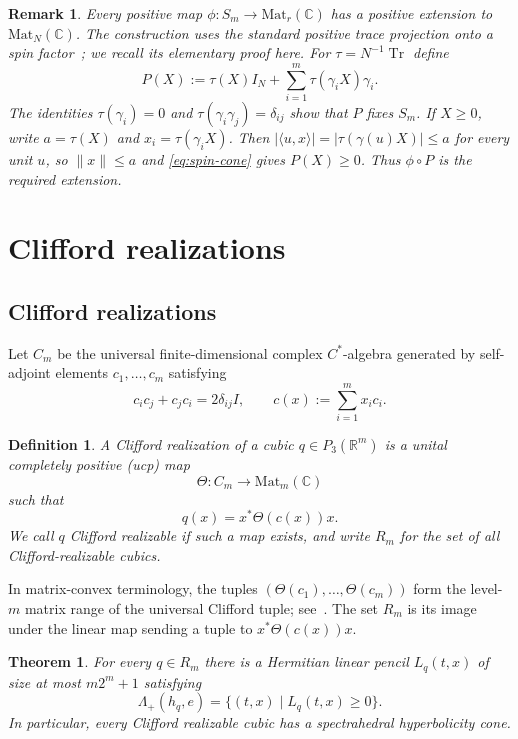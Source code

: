 \documentclass[11pt,onecolumn]{article}
\theoremstyle{blueplain}
\newtheorem{theorem}{Theorem}[section]
\theoremstyle{bluedefinition}
\newtheorem{definition}[definition]{Definition}
\theoremstyle{bluedefinition}
\newtheorem{remark}[remark]{Remark}
\newcommand{\C}{\mathbb C}
\newcommand{\M}{\mathrm{Mat}}
\newcommand{\Tr}{\operatorname{Tr}}
\begin{document}
\begin{remark}
Every positive map $\phi\colon S_m\to \M_r(\C)$ has a positive extension to $\M_N(\C)$.
The construction uses the standard positive trace projection onto a spin
factor~\cite{Stormer}; we recall its elementary proof here.
For $\tau=N^{-1}\Tr$ define
\[
P(X):=\tau(X)I_N+\sum_{i=1}^m\tau(\gamma_iX)\gamma_i.
\]
The identities $\tau(\gamma_i)=0$ and
$\tau(\gamma_i\gamma_j)=\delta_{ij}$ show that $P$ fixes $S_m$. If $X\geqslant0$,
write $a=\tau(X)$ and $x_i=\tau(\gamma_iX)$. Then
$|\langle u,x\rangle|=|\tau(\gamma(u)X)|\leqslant a$ for every unit $u$, so
$\|x\|\leqslant a$ and \eqref{eq:spin-cone} gives $P(X)\geqslant0$.
Thus $\phi\circ P$ is the required extension.
\end{remark}

\section{Clifford realizations}\label{s:clifford}

\subsection{Clifford realizations}

Let $C_m$ be the universal finite-dimensional complex $C^*$-algebra generated by
self-adjoint elements $c_1,\ldots,c_m$ satisfying
\[
c_ic_j+c_jc_i=2\delta_{ij}I,\qquad
c(x):=\sum_{i=1}^m x_ic_i.
\]

\begin{definition}\label{d:DCl}
A \emph{Clifford realization} of a cubic $q\in P_3(\mathbb R^m)$ is a unital
completely positive (ucp) map
\[
\Theta\colon C_m\to \M_m(\C)
\]
such that
\[
q(x)=x^*\Theta(c(x))x.
\]
We call $q$ \emph{Clifford realizable} if such a map exists, and write
$R_m$ for the set of all Clifford-realizable cubics.
\end{definition}
In matrix-convex terminology, the tuples $(\Theta(c_1),\ldots,\Theta(c_m))$
form the level-$m$ matrix range of the universal Clifford tuple;
see~\cite{PasserShalitSolel}.  The set $R_m$ is its image
under the linear map sending a tuple to $x^*\Theta(c(x))x$.

\begin{theorem}
\label{t:ucp}\label{p:common}
For every $q\in R_m$ there is a Hermitian linear pencil
$L_q(t,x)$ of size at most $m2^m+1$ satisfying
\[
\Lambda_+(h_q,e)=\{(t,x)\mid L_q(t,x)\geqslant0\}.
\]
In particular, every Clifford realizable cubic has a spectrahedral
hyperbolicity cone.
\end{theorem}
\end{document}
